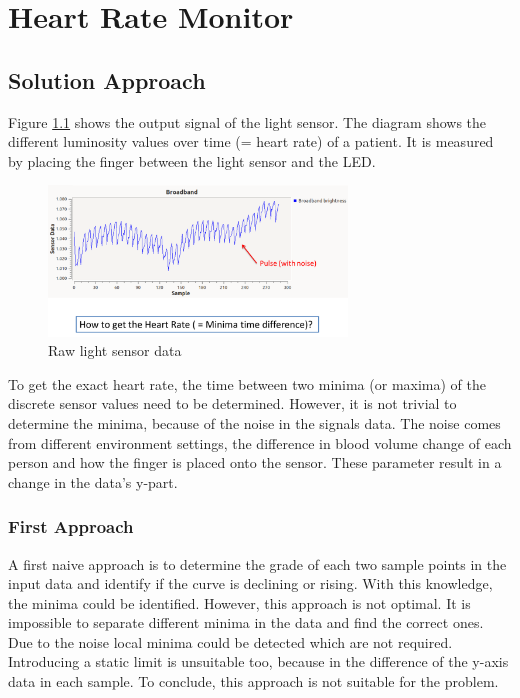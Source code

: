 \documentclass[notitlepage]{scrreprt}
\begin{document}
\chapter{Heart Rate Monitor}
\label{chap:hrm}
\section{Solution Approach}
Figure \ref{fig:raw-data} shows the output signal of the light sensor. The diagram shows the different luminosity values over time (= heart rate) of a patient. It is measured by placing the finger between the light sensor and the LED.

\begin{figure}[H]
	\centering
	\includegraphics[width=300px]{images/rawData.png}
	\caption{Raw light sensor data}
	\label{fig:raw-data}
\end{figure}

To get the exact heart rate, the time between two minima (or maxima) of the discrete sensor values need to be determined. However, it is not trivial to determine the minima, because of the noise in the signals data. The noise comes from different environment settings, the difference in blood volume change of each person and how the finger is placed onto the sensor. These parameter result in a change in the data's y-part.

\subsection{First Approach}
A first naive approach is to determine the grade of each two sample points in the input data and identify if the curve is declining or rising. With this knowledge, the minima could be identified. However, this approach is not optimal. It is impossible to separate different minima in the data and find the correct ones. Due to the noise local minima could be detected which are not required. Introducing a static limit is unsuitable too, because in the difference of the y-axis data in each sample. To conclude, this approach is not suitable for the problem.
\end{document}
